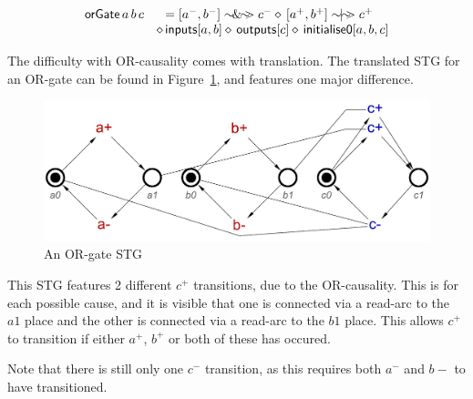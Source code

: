 \documentclass[british,conference,compsoc]{IEEEtran}
\begin{document}
\[
\begin{array}{lcl}
\mathsf{orGate}\,a \,b \,c&\hspace{-2mm}=[a^{-}, b^{-}] \sim\hspace{-1.5mm}\&\hspace{-1.5mm}\sim\hspace{-1.5mm}> c^{-} \diamond\, [a^{+}, b^{+}] \sim\hspace{-1.5mm}|\hspace{-1.5mm}\sim\hspace{-1.5mm}> c^{+} \\
&\diamond\, \mathsf{inputs}[a, b] \diamond\, \mathsf{outputs}[c] \diamond\, \mathsf{initialise0} [a, b, c]
\end{array}
\]

\noindent The difficulty with OR-causality comes with translation. The translated STG for an OR-gate
can be found in Figure~\ref{fig:or-gate-stg}, and features one major difference.
\begin{figure}[h]
\begin{centering}
\includegraphics[scale=0.25]{Images/or-gate-stg}
\par\end{centering}
\protect\caption{\label{fig:or-gate-stg} An OR-gate STG}
\end{figure}

This STG features 2 different $c^{+}$ transitions, due to the OR-causality. 
This is for each possible cause, and it is visible that one is connected via a 
read-arc to the $a1$ place and the other is connected via a read-arc to 
the $b1$ place. This allows $c^{+}$ to transition if either $a^{+}$, 
$b^{+}$ or both of these has occured.

Note that there is still only one $c^{-}$ transition, as this requires both
$a^{-}$ and $b{-}$ to have transitioned.
\end{document}
